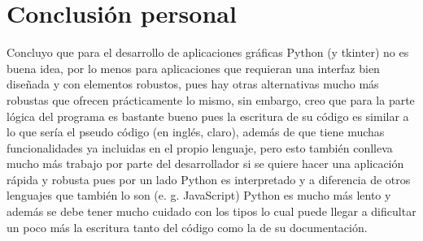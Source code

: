 \section{Conclusión personal}
Concluyo que para el desarrollo de aplicaciones gráficas Python (y tkinter) no es buena idea, por lo menos para aplicaciones que requieran una interfaz bien diseñada y con elementos robustos, pues hay otras alternativas mucho más robustas que ofrecen prácticamente lo mismo, sin embargo, creo que para la parte lógica del programa es bastante bueno pues la escritura de su código es similar a lo que sería el pseudo código (en inglés, claro), además de que tiene muchas funcionalidades ya incluidas en el propio lenguaje, pero esto también conlleva mucho más trabajo por parte del desarrollador si se quiere hacer una aplicación rápida y robusta pues por un lado Python es interpretado y a diferencia de otros lenguajes que también lo son (e. g. JavaScript) Python es mucho más lento y además se debe tener mucho cuidado con los tipos lo cual puede llegar a dificultar un poco más la escritura tanto del código como la de su documentación.